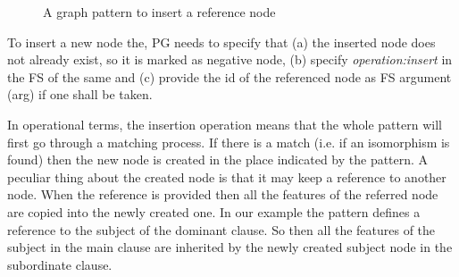 \begin{figure}[!ht]
\centering
{}
\caption{A graph pattern to insert a reference node}
\label{fig:gp5}
\end{figure}


To insert a new node the, PG needs to specify that (a) the inserted node does not already exist, so it is marked as negative node, (b) specify \textit{operation:insert} in the FS of the same and (c) provide the id of the referenced node as FS argument (arg) if one shall be taken.

In operational terms, the insertion operation means that the whole pattern will first go through a matching process. If there is a match (i.e. if an isomorphism is found) then the new node is created in the place indicated by the pattern. A peculiar thing about the created node is that it may keep a reference to another node. When the reference is provided then all the features of the referred node are copied into the newly created one.  In our example the pattern defines a reference to the subject of the dominant clause. So then all the features of the subject in the main clause are inherited by the newly created subject node in the subordinate clause. 

